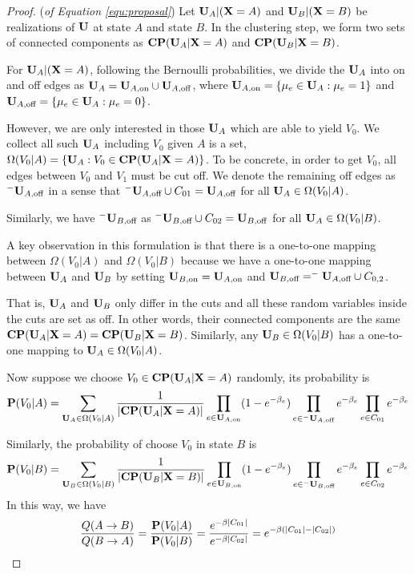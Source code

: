 \documentclass{article}
\begin{document}
\begin{proof}(\textit{of Equation \ref{equ:proposal}})
Let $\mathbf{U}_A|(\mathbf{X}=A)$ and $\mathbf{U}_B|(\mathbf{X}=B)$ be realizations of $\mathbf{U}$ at state $A$ and state $B$. In the clustering step, we form two sets of connected components as $\mathbf{CP}(\mathbf{U}_A|\mathbf{X}=A)$ and $\mathbf{CP}(\mathbf{U}_B|\mathbf{X}=B)$. 

For $\mathbf{U}_A|(\mathbf{X}=A)$, following the Bernoulli probabilities, we divide the $\mathbf{U}_A$ into on and off edges as $\mathbf{U}_A=\mathbf{U}_{A,\text{on}}\cup \mathbf{U}_{A,\text{off}}$, where $\mathbf{U}_{A,\text{on}}=\{\mu_e\in \mathbf{U}_A:\mu_e=1\}$ and $\mathbf{U}_{A,\text{off}}=\{\mu_e\in \mathbf{U}_A:\mu_e=0\}$.

However, we are only interested in those $\mathbf{U}_A$ which are able to yield $V_0$. We collect all such $\mathbf{U}_A$ including $V_0$ given $A$ is a set, $\Omega(V_0|A)=\{\mathbf{U}_A: V_0\in \mathbf{CP}(\mathbf{U}_A|\mathbf{X}=A)\}$. To be concrete, in order to get $V_0$, all edges between $V_0$ and $V_1$ must be cut off. We denote the remaining off edges as $^{-}\mathbf{U}_{A,\text{off}}$ in a sense that $^{-}\mathbf{U}_{A,\text{off}}\cup C_{01}=\mathbf{U}_{A,\text{off}}$ for all $\mathbf{U}_A\in \Omega(V_0|A)$.

Similarly, we have $^{-}\mathbf{U}_{B,\text{off}}$ as $^{-}\mathbf{U}_{B,\text{off}}\cup C_{02}=\mathbf{U}_{B,\text{off}}$ for all $\mathbf{U}_A\in \Omega(V_0|B)$.

A key observation in this formulation is that there is a one-to-one mapping between $\Omega(V_0|A)$ and $\Omega(V_0|B)$ because we have a one-to-one mapping between $\mathbf{U}_A$ and $\mathbf{U}_B$ by setting $\mathbf{U}_{B,\text{on}}=\mathbf{U}_{A,\text{on}}$ and $\mathbf{U}_{B,\text{off}}=^{-}\mathbf{U}_{A,\text{off}}\cup C_{0,2}$.

That is, $\mathbf{U}_A$ and $\mathbf{U}_B$ only differ in the cuts and all these random variables inside the cuts are set as off. In other words, their connected components are the same $\mathbf{CP}(\mathbf{U}_A|\mathbf{X}=A)=\mathbf{CP}(\mathbf{U}_B|\mathbf{X}=B)$. Similarly, any $\mathbf{U}_B\in \Omega(V_0|B)$ has a one-to-one mapping to $\mathbf{U}_A\in \Omega(V_0|A)$.

Now suppose we choose $V_0\in \mathbf{CP}(\mathbf{U}_A|\mathbf{X}=A)$ randomly, its probability is
\[\mathbf{P}(V_0|A)=\sum_{\mathbf{U}_A\in \Omega(V_0|A)}\frac{1}{|\mathbf{CP}(\mathbf{U}_A|\mathbf{X}=A)|}\prod_{e\in \mathbf{U}_{A,\text{on}}}(1-e^{-\beta_e})\prod_{e\in ^{-}\mathbf{U}_{A,\text{off}}}e^{-\beta_e}\prod_{e\in C_{01}}e^{-\beta_e}\]

Similarly, the probability of choose $V_0$ in state $B$ is
\[\mathbf{P}(V_0|B)=\sum_{\mathbf{U}_B\in \Omega(V_0|B)}\frac{1}{|\mathbf{CP}(\mathbf{U}_B|\mathbf{X}=B)|}\prod_{e\in \mathbf{U}_{B,\text{on}}}(1-e^{-\beta_e})\prod_{e\in ^{-}\mathbf{U}_{B,\text{off}}}e^{-\beta_e}\prod_{e\in C_{02}}e^{-\beta_e}\]
In this way, we have
\[\frac{Q(A\to B)}{Q(B\to A)}=\frac{\mathbf{P}(V_0|A)}{\mathbf{P}(V_0|B)}=\frac{e^{-\beta|C_{01}|}}{e^{-\beta|C_{02}|}}=e^{-\beta(|C_{01}|-|C_{02}|)}\]
\end{proof}
\end{document}
